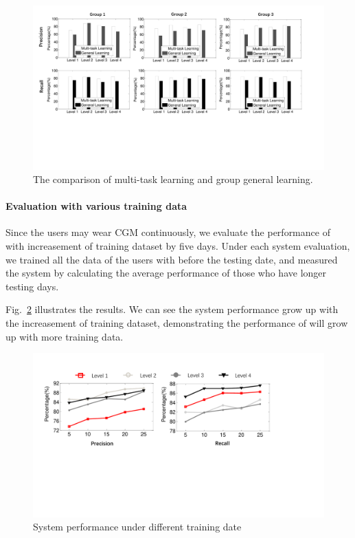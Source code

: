\begin{figure}[!t]
\centering
\includegraphics[width=0.9\columnwidth]{./img/group_multi_task.pdf}
\caption{The comparison of multi-task learning and group general learning.}
\label{fig:pre_gt}
\end{figure}


\paragraph{Evaluation with various training data}

Since the users may wear CGM continuously, we evaluate the performance of \sysname with increasement of training dataset by five days. Under each system evaluation, we trained all the data of the users with before the testing date, and measured the system by calculating the average performance of those who have longer testing days.

Fig.~\ref{fig:per_under_train_days} illustrates the results. We can see the system performance grow up with the increasement of training dataset, demonstrating the performance of \sysname will grow up with more training data.


\begin{figure}[!t]
\centering
\includegraphics[width=0.9\columnwidth]{./img/performance_under_days.pdf}
\caption{System performance under different training date}
\label{fig:per_under_train_days}
\end{figure}




